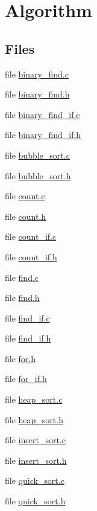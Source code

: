 \hypertarget{group__algorithm}{\section{Algorithm}
\label{group__algorithm}
}
\subsection*{Files}
\begin{DoxyCompactItemize}
\item 
file \hyperlink{binary__find_8c}{binary\-\_\-find.\-c}
\item 
file \hyperlink{binary__find_8h}{binary\-\_\-find.\-h}
\item 
file \hyperlink{binary__find__if_8c}{binary\-\_\-find\-\_\-if.\-c}
\item 
file \hyperlink{binary__find__if_8h}{binary\-\_\-find\-\_\-if.\-h}
\item 
file \hyperlink{bubble__sort_8c}{bubble\-\_\-sort.\-c}
\item 
file \hyperlink{bubble__sort_8h}{bubble\-\_\-sort.\-h}
\item 
file \hyperlink{count_8c}{count.\-c}
\item 
file \hyperlink{count_8h}{count.\-h}
\item 
file \hyperlink{count__if_8c}{count\-\_\-if.\-c}
\item 
file \hyperlink{count__if_8h}{count\-\_\-if.\-h}
\item 
file \hyperlink{find_8c}{find.\-c}
\item 
file \hyperlink{find_8h}{find.\-h}
\item 
file \hyperlink{find__if_8c}{find\-\_\-if.\-c}
\item 
file \hyperlink{find__if_8h}{find\-\_\-if.\-h}
\item 
file \hyperlink{for_8h}{for.\-h}
\item 
file \hyperlink{for__if_8h}{for\-\_\-if.\-h}
\item 
file \hyperlink{heap__sort_8c}{heap\-\_\-sort.\-c}
\item 
file \hyperlink{heap__sort_8h}{heap\-\_\-sort.\-h}
\item 
file \hyperlink{insert__sort_8c}{insert\-\_\-sort.\-c}
\item 
file \hyperlink{insert__sort_8h}{insert\-\_\-sort.\-h}
\item 
file \hyperlink{quick__sort_8c}{quick\-\_\-sort.\-c}
\item 
file \hyperlink{quick__sort_8h}{quick\-\_\-sort.\-h}

\end{DoxyCompactItemize}
